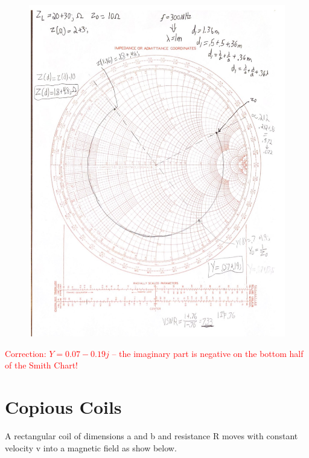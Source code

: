 \documentclass{article}
\begin{document}
\begin{figure}[H]
\begin{center}
    \includegraphics[width= 0.9
    \textwidth]{figures/Distance Solution.jpg}
\end{center}
\end{figure}

\textcolor{red}{Correction: $Y=0.07-0.19j$ -- the imaginary part is negative on the bottom half of the Smith Chart!}

\newpage

\section{Copious Coils}
A rectangular coil of dimensions a and b and resistance R moves with constant velocity v into a magnetic field as show below.
\end{document}
